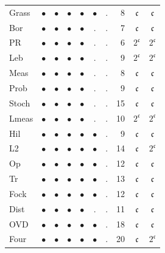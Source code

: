 {\begin{longtable}{l c c c c c c r c c}
\textsf{Grass} & $\bullet$ & $\bullet$ & $\bullet$ & $\bullet$ & $\bullet$ & . & 8 & $\mathfrak c$ & $\mathfrak c$ \\
\textsf{Bor} & $\bullet$ & $\bullet$ & $\bullet$ & $\bullet$ & . & . & 7 & $\mathfrak c$ & $\mathfrak c$ \\
\textsf{PR} & $\bullet$ & $\bullet$ & $\bullet$ & $\bullet$ & . & . & 6 & $2^{\mathfrak c}$ & $2^{\mathfrak c}$ \\
\textsf{Leb} & $\bullet$ & $\bullet$ & $\bullet$ & $\bullet$ & . & . & 9 & $2^{\mathfrak c}$ & $2^{\mathfrak c}$ \\
\textsf{Meas} & $\bullet$ & $\bullet$ & $\bullet$ & $\bullet$ & . & . & 8 & $\mathfrak c$ & $\mathfrak c$ \\
\textsf{Prob} & $\bullet$ & $\bullet$ & $\bullet$ & $\bullet$ & . & . & 9 & $\mathfrak c$ & $\mathfrak c$ \\
\textsf{Stoch} & $\bullet$ & $\bullet$ & $\bullet$ & $\bullet$ & . & . & 15 & $\mathfrak c$ & $\mathfrak c$ \\
\textsf{Lmeas} & $\bullet$ & $\bullet$ & $\bullet$ & $\bullet$ & . & . & 10 & $2^{\mathfrak c}$ & $2^{\mathfrak c}$ \\
\textsf{Hil} & $\bullet$ & $\bullet$ & $\bullet$ & $\bullet$ & $\bullet$ & . & 9 & $\mathfrak c$ & $\mathfrak c$ \\
\textsf{L2} & $\bullet$ & $\bullet$ & $\bullet$ & $\bullet$ & $\bullet$ & . & 14 & $\mathfrak c$ & $2^{\mathfrak c}$ \\
\textsf{Op} & $\bullet$ & $\bullet$ & $\bullet$ & $\bullet$ & $\bullet$ & . & 12 & $\mathfrak c$ & $\mathfrak c$ \\
\textsf{Tr} & $\bullet$ & $\bullet$ & $\bullet$ & $\bullet$ & $\bullet$ & . & 13 & $\mathfrak c$ & $\mathfrak c$ \\
\textsf{Fock} & $\bullet$ & $\bullet$ & $\bullet$ & $\bullet$ & $\bullet$ & . & 12 & $\mathfrak c$ & $\mathfrak c$ \\
\textsf{Dist} & $\bullet$ & $\bullet$ & $\bullet$ & $\bullet$ & . & . & 11 & $\mathfrak c$ & $\mathfrak c$ \\
\textsf{OVD} & $\bullet$ & $\bullet$ & $\bullet$ & $\bullet$ & $\bullet$ & . & 18 & $\mathfrak c$ & $\mathfrak c$ \\
\textsf{Four} & $\bullet$ & $\bullet$ & $\bullet$ & $\bullet$ & $\bullet$ & . & 20 & $\mathfrak c$ & $2^{\mathfrak c}$ \\
\end{longtable}
}
